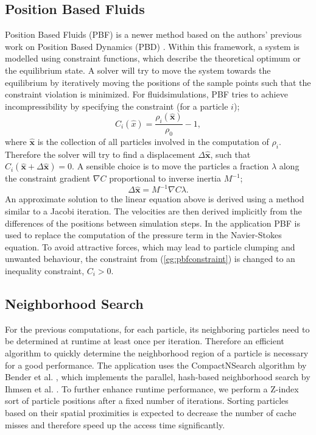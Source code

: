 \documentclass[11pt, letterpaper, twocolumn]{article}
\begin{document}
\subsection{Position Based Fluids}
\label{subsec:pbf}

Position Based Fluids (PBF) is a newer method based on the authors' previous work on Position Based Dynamics (PBD) \cite{muller2007}.
Within this framework, a system is modelled using constraint functions, which describe the theoretical optimum or the equilibrium state. A solver will try to move the system towards the equilibrium by iteratively moving the positions of the sample points such that the constraint violation is minimized. For fluidsimulations, PBF tries to achieve incompressibility by specifying the constraint (for a particle \(i\));
\begin{equation}
  C_i(\hat{x}) = \frac{\rho_i(\hat{\mathbf{x}})}{\rho_0} - 1,
  \label{eg:pbfconstraint}
\end{equation}
where \(\hat{\mathbf{x}}\) is the collection of all particles involved in the computation of \(\rho_i\). Therefore the solver will try to find a displacement \(\Delta \hat{\mathbf{x}}\), such that \( C_i(\hat{\mathbf{x}} + \Delta\hat{\mathbf{x}}) = 0\). A sensible choice is to move the particles a fraction \(\lambda\) along the constraint gradient \(\nabla C\) proportional to inverse inertia \(M^{-1}\);
\begin{equation}
  \Delta\hat{\mathbf{x}} = M^{-1} \nabla C \lambda.
  \label{eg:deltax}
\end{equation}
An approximate solution to the linear equation above is derived using a method similar to a Jacobi iteration. The velocities are then derived implicitly from the differences of the positions between simulation steps.
In the application PBF is used to replace the computation of the pressure term in the Navier-Stokes equation. To avoid attractive forces, which may lead to particle clumping and unwanted behaviour, the constraint from (\ref{eg:pbfconstraint}) is changed to an inequality constraint, \(C_i > 0\).

\subsection{Neighborhood Search}
For the previous computations, for each particle, its neighboring particles need to be determined at runtime at least once per iteration. Therefore an efficient algorithm to quickly determine the neighborhood region of a particle is necessary for a good performance.
The application uses the CompactNSearch algorithm by Bender et al. \cite{bender2015}, which implements the parallel, hash-based neighborhood search by Ihmsen et al. \cite{ihmsen2011}. To further enhance runtime performance, we perform a Z-index sort of particle positions after a fixed number of iterations. Sorting particles based on their spatial proximities is expected to decrease the number of cache misses and therefore speed up the access time significantly.
\end{document}
